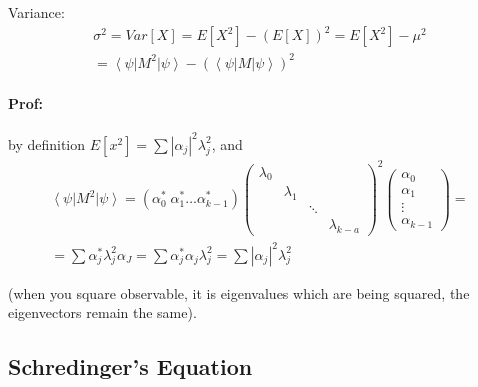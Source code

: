 \documentclass{scrartcl}
\newcommand{\ket}[1]{\left| #1 \right>} %
\newcommand{\bra}[1]{\left< #1 \right|} %
\begin{document}
Variance: \begin{gather*} \sigma^2 = Var[X] = E[X^2] - (E[X])^2 = E[X^2] - \mu^2\\
  = \bra\psi M^2 \ket\psi - (\bra\psi M \ket\psi)^2
\end{gather*}

\paragraph{Prof:} by definition $E[x^2] = \sum |\alpha_j|^2 \lambda_j^2$, and
\begin{gather*}\bra\psi M^2\ket\psi = (\alpha_0^* \; \alpha_1^*
  \dots \alpha_{k-1}^*) \begin{pmatrix} \lambda_0 &&& \\ & \lambda_1 && \\ &&
    \ddots &\\ &&& \lambda_{k-a}\end{pmatrix}^2 \begin{pmatrix} \alpha_0 \\
    \alpha_1
    \\ \vdots \\ \alpha_{k-1} \end{pmatrix} = \\
  = \sum \alpha_j^*\lambda_j^2\alpha_J = \sum \alpha_j^*\alpha_j\lambda_j^2 =
  \sum |\alpha_j|^2 \lambda_j^2
\end{gather*}

(when you square observable, it is eigenvalues which are being squared, the
eigenvectors remain the same).

\subsection{Schredinger's Equation}
\label{sec:8-4}
\end{document}
